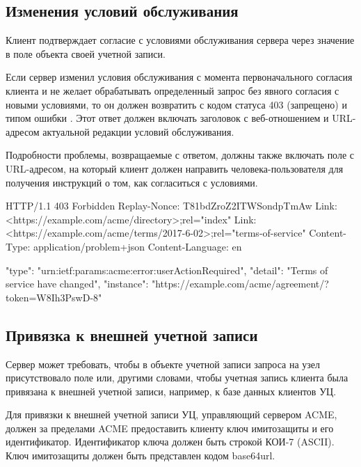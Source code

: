 \subsection{Изменения условий обслуживания}\label{ACME.Account.ToS} 

Клиент подтверждает согласие с условиями обслуживания сервера через
значение  в поле  объекта своей учетной 
записи. 

Если сервер изменил условия обслуживания с момента первоначального согласия 
клиента и не желает обрабатывать определенный запрос без явного согласия с 
новыми условиями, то он должен возвратить  
с кодом статуса 403 (запрещено) и типом ошибки . Этот 
ответ должен включать заголовок  с веб-отношением 
 и URL-адресом актуальной редакции условий обслуживания.

Подробности проблемы, возвращаемые с ответом, должны также включать поле 
 с URL-адресом, на который клиент должен направить 
человека-пользователя для получения инструкций о том, как согласиться с 
условиями. 

\begin{codeblock}
HTTP/1.1 403 Forbidden
Replay-Nonce: T81bdZroZ2ITWSondpTmAw
Link: <https://example.com/acme/directory>;rel="index"
Link: <https://example.com/acme/terms/2017-6-02>;rel="terms-of-service"
Content-Type: application/problem+json
Content-Language: en

{
  "type": "urn:ietf:params:acme:error:userActionRequired",
  "detail": "Terms of service have changed",
  "instance": "https://example.com/acme/agreement/?token=W8Ih3PswD-8"
}
\end{codeblock}
\fi

\subsection{Привязка к внешней учетной записи}\label{ACME.Account.Binding}

Сервер может требовать, чтобы в объекте учетной записи запроса на узел
 присутствовало поле  
или, другими словами, чтобы учетная запись клиента была привязана к внешней 
учетной записи, например, к базе данных клиентов УЦ.

Для привязки к внешней учетной записи УЦ, управляющий сервером ACME, 
должен за пределами ACME предоставить клиенту ключ имитозащиты и его 
идентификатор. Идентификатор ключа должен быть строкой КОИ-7 (ASCII). 
Ключ имитозащиты должен быть представлен кодом base64url. 

